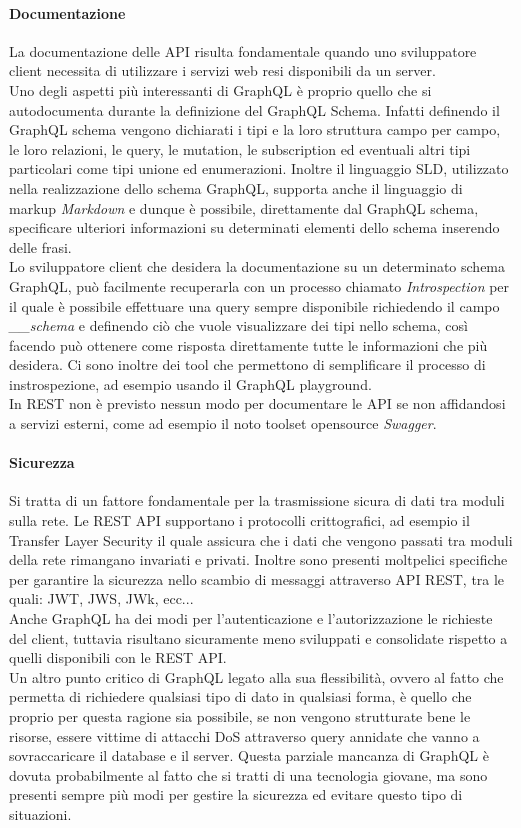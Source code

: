 \paragraph{Documentazione}
La documentazione delle API risulta fondamentale quando uno sviluppatore client necessita di utilizzare i servizi web resi disponibili da un server.\\
Uno degli aspetti più interessanti di GraphQL è proprio quello che si autodocumenta durante la definizione del GraphQL Schema. Infatti definendo il GraphQL schema vengono dichiarati i tipi e la loro struttura campo per campo, le loro relazioni, le query, le mutation, le subscription ed eventuali altri tipi particolari come tipi unione ed enumerazioni. Inoltre il linguaggio SLD, utilizzato nella realizzazione dello schema GraphQL, supporta anche il linguaggio di markup \textit{Markdown} e dunque è possibile, direttamente dal GraphQL schema, specificare ulteriori informazioni su determinati elementi dello schema inserendo delle frasi.\\
Lo sviluppatore client che desidera la documentazione su un determinato schema GraphQL, può facilmente recuperarla con un processo chiamato \textit{Introspection} per il quale è possibile effettuare una query sempre disponibile richiedendo il campo \textit{\_\_schema} e definendo ciò che vuole visualizzare dei tipi nello schema, così facendo può ottenere come risposta direttamente tutte le informazioni che più desidera. Ci sono inoltre dei tool che permettono di semplificare il processo di instrospezione, ad esempio usando il GraphQL playground.\\
In REST non è previsto nessun modo per documentare le API se non affidandosi a servizi esterni, come ad esempio il noto toolset opensource \textit{Swagger}.
\paragraph{Sicurezza}
Si tratta di un fattore fondamentale per la trasmissione sicura di dati tra moduli sulla rete. Le REST API supportano i protocolli crittografici, ad esempio il Transfer Layer Security il quale assicura che i dati che vengono passati tra moduli della rete rimangano invariati e privati. Inoltre sono presenti moltpelici specifiche per garantire la sicurezza nello scambio di messaggi attraverso API REST, tra le quali: JWT, JWS, JWk, ecc...\\
Anche GraphQL ha dei modi per l'autenticazione e l'autorizzazione le richieste del client, tuttavia risultano sicuramente meno sviluppati e consolidate rispetto a quelli disponibili con le REST API.\\
Un altro punto critico di GraphQL legato alla sua flessibilità, ovvero al fatto che permetta di richiedere qualsiasi tipo di dato in qualsiasi forma, è quello che proprio per questa ragione sia possibile, se non vengono strutturate bene le risorse, essere vittime di attacchi DoS attraverso query annidate che vanno a sovraccaricare il database e il server. Questa parziale mancanza di GraphQL è dovuta probabilmente al fatto che si tratti di una tecnologia giovane, ma sono presenti sempre più modi per gestire la sicurezza ed evitare questo tipo di situazioni.
